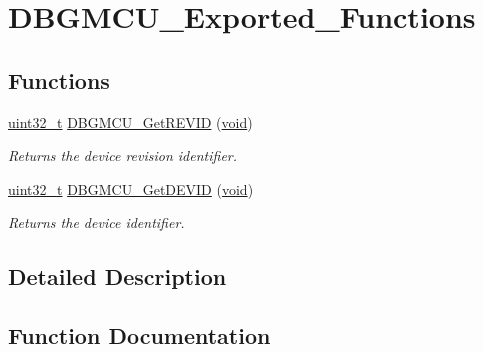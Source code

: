 \hypertarget{group___d_b_g_m_c_u___exported___functions}{}\section{D\+B\+G\+M\+C\+U\+\_\+\+Exported\+\_\+\+Functions}
\label{group___d_b_g_m_c_u___exported___functions}
\subsection*{Functions}
\begin{DoxyCompactItemize}
\item 
\hyperlink{_p_e___types_8h_a33594304e786b158f3fb30289278f5af}{uint32\+\_\+t} \hyperlink{group___d_b_g_m_c_u___exported___functions_ga47419e9ca75ab7be4c70feb82faa0511}{D\+B\+G\+M\+C\+U\+\_\+\+Get\+R\+E\+V\+ID} (\hyperlink{usb__devapi_8h_afabf60e7f57651d6d595a02c75f07cd0}{void})
\begin{DoxyCompactList}\small\item\em Returns the device revision identifier. \end{DoxyCompactList}\item 
\hyperlink{_p_e___types_8h_a33594304e786b158f3fb30289278f5af}{uint32\+\_\+t} \hyperlink{group___d_b_g_m_c_u___exported___functions_gac34193c34dbce759bf424957a31b3266}{D\+B\+G\+M\+C\+U\+\_\+\+Get\+D\+E\+V\+ID} (\hyperlink{usb__devapi_8h_afabf60e7f57651d6d595a02c75f07cd0}{void})
\begin{DoxyCompactList}\small\item\em Returns the device identifier. \end{DoxyCompactList}\end{DoxyCompactItemize}


\subsection{Detailed Description}


\subsection{Function Documentation}
